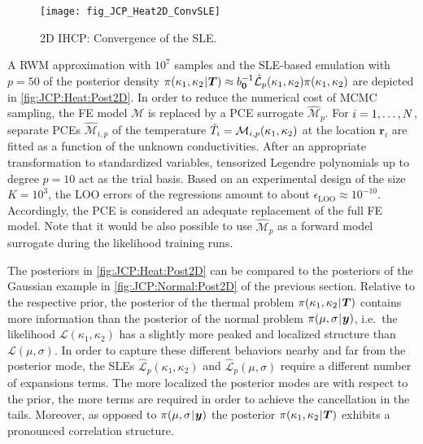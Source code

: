 \begin{figure}[htbp]
  \centering
  \texttt{[image: fig\_JCP\_Heat2D\_ConvSLE]}
  \caption[2D IHCP: Convergence of the SLE]{2D IHCP: Convergence of the SLE.}
  \label{fig:JCP:Heat:ConvSLE}
\end{figure}
\par %
A RWM approximation with \(10^7\) samples and the SLE-based emulation with \(p = 50\) of the posterior density
\(\pi(\kappa_1,\kappa_2 {\:\!}|{\:\!} \bm{T}) \approx b_{\bm{0}}^{-1} \hat{\mathcal{L}}_p(\kappa_1,\kappa_2) \pi(\kappa_1,\kappa_2)\) are depicted in \cref{fig:JCP:Heat:Post2D}.
In order to reduce the numerical cost of MCMC sampling, the FE model \(\mathcal{M}\) is replaced by a PCE surrogate \(\hat{\mathcal{M}}_p\).
For \(i = 1,\ldots,N\), separate PCEs \(\hat{\mathcal{M}}_{i,p}\) of the temperature \(\tilde{T}_i = \mathcal{M}_{i,p}(\kappa_1,\kappa_2)\)
at the location \(\bm{r}_i\) are fitted as a function of the unknown conductivities.
After an appropriate transformation to standardized variables, tensorized Legendre polynomials up to degree \(p = 10\) act as the trial basis.
Based on an experimental design of the size \(K = 10^3\), the LOO errors of the regressions amount to about \(\epsilon_{\mathrm{LOO}} \approx 10^{-10}\).
Accordingly, the PCE is considered an adequate replacement of the full FE model.
Note that it would be also possible to use \(\hat{\mathcal{M}}_p\) as a forward model surrogate during the likelihood training runs.
\par %
The posteriors in \cref{fig:JCP:Heat:Post2D} can be compared to the posteriors of the Gaussian example in \cref{fig:JCP:Normal:Post2D} of the previous section.
Relative to the respective prior, the posterior of the thermal problem \(\pi(\kappa_1,\kappa_2 {\:\!}|{\:\!} \bm{T})\)
contains more information than the posterior of the normal problem \(\pi(\mu,\sigma {\:\!}|{\:\!} \bm{y})\),
i.e.\ the likelihood \(\mathcal{L}(\kappa_1,\kappa_2)\) has a slightly more peaked and localized structure than \(\mathcal{L}(\mu,\sigma)\).
In order to capture these different behaviors nearby and far from the posterior mode,
the SLEs \(\hat{\mathcal{L}}_p(\kappa_1,\kappa_2)\) and \(\hat{\mathcal{L}}_p(\mu,\sigma)\) require a different number of expansions terms.
The more localized the posterior modes are with respect to the prior, the more terms are required in order to achieve the cancellation in the tails.
Moreover, as opposed to \(\pi(\mu,\sigma {\:\!}|{\:\!} \bm{y})\) the posterior \(\pi(\kappa_1,\kappa_2 {\:\!}|{\:\!} \bm{T})\) exhibits a pronounced correlation structure.
